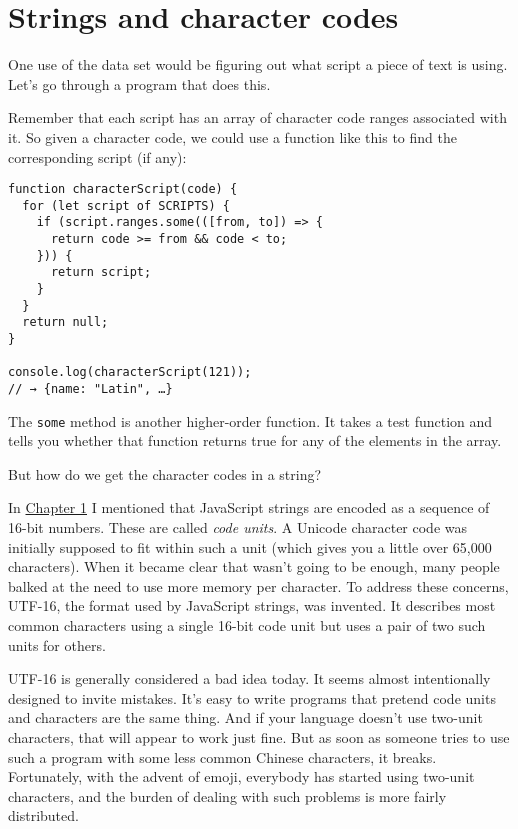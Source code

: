 \section{Strings and character codes}

One use of the data set would be figuring out what script a piece of text is using. Let's go through a program that does this.

Remember that each script has an array of character code ranges associated with it. So given a character code, we could use a function like this to find the corresponding script (if any):

\begin{lstlisting}
function characterScript(code) {
  for (let script of SCRIPTS) {
    if (script.ranges.some(([from, to]) => {
      return code >= from && code < to;
    })) {
      return script;
    }
  }
  return null;
}

console.log(characterScript(121));
// → {name: "Latin", …}
\end{lstlisting}
\noindent

The \lstinline`some` method is another higher-order function. It takes a test function and tells you whether that function returns true for any of the elements in the array.

\label{higher_order.code_units}But how do we get the character codes in a string?

In \hyperref[values]{Chapter 1} I mentioned that JavaScript strings are encoded as a sequence of 16-bit numbers. These are called \emph{code
units}. A Unicode character code was initially supposed to fit within such a unit (which gives you a little over 65,000 characters). When it became clear that wasn't going to be enough, many people balked at the need to use more memory per character. To address these concerns, UTF-16, the format used by JavaScript strings, was invented. It describes most common characters using a single 16-bit code unit but uses a pair of two such units for others.

UTF-16 is generally considered a bad idea today. It seems almost intentionally designed to invite mistakes. It's easy to write programs that pretend code units and characters are the same thing. And if your language doesn't use two-unit characters, that will appear to work just fine. But as soon as someone tries to use such a program with some less common Chinese characters, it breaks. Fortunately, with the advent of emoji, everybody has started using two-unit characters, and the burden of dealing with such problems is more fairly distributed.

